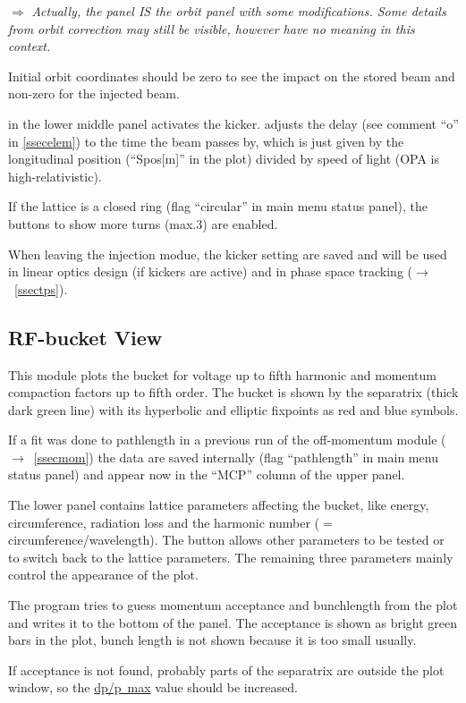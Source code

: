 \documentclass[12pt]{article}
\newcommand{\see}{\mbox{$\rightarrow$~}}
\newcommand\todo[1]{$\Longrightarrow$ {\em #1} }
\newcommand\button[1]{\fbox{\small\bf #1}}
\newcommand\field[1]{\underline{\small #1}}
\begin{document}
\todo{Actually, the panel IS the orbit panel with some modifications. Some details from orbit correction may still be visible, however have no meaning in this context.}

Initial orbit coordinates should be zero to see the impact on the stored beam and non-zero for the injected beam.

\button{ON/OFF} in the lower middle panel activates the kicker. \button{Sync} adjusts the delay (see comment ``o'' in \ref{ssecelem}) to the time the beam passes by, which is just given by the longitudinal position (``Spos[m]'' in the plot) divided by speed of light (OPA is high-relativistic).

If the lattice is a closed ring (flag ``circular'' in main menu status panel), the \button{$+$} \button{$-$} buttons to show more turns (max.3) are enabled.

When leaving the injection modue, the kicker setting are saved and will be used in linear optics design (if kickers are active) and in phase space tracking (\see\ref{ssectps}).


\subsection{\label{ssecbuc}RF-bucket View}
This module plots the bucket for voltage up to fifth harmonic and momentum compaction factors up to fifth order. The bucket is shown by the separatrix (thick dark green line) with its hyperbolic and elliptic fixpoints as red and blue symbols.

If a fit was done to pathlength in a previous run of the off-momentum module (\see\ref{ssecmom}) the data are saved internally (flag ``pathlength'' in main menu status panel) and appear now in the ``MCP'' column of the upper panel.

The lower panel contains lattice parameters affecting the bucket, like energy, circumference, radiation loss and the harmonic number ($=$ circumference/wavelength). The \button{Lattice} button allows other parameters to be tested or to switch back to the lattice parameters. The remaining three parameters mainly control the appearance of the plot. 

The program tries to guess momentum acceptance and bunchlength from the plot and writes it to the bottom of the panel. The acceptance is shown as bright green bars in the plot, bunch length is not shown because it is too small usually.

If acceptance is not found, probably parts of the separatrix are outside the plot window, so the \field{dp/p~max} value should be increased.
\end{document}

